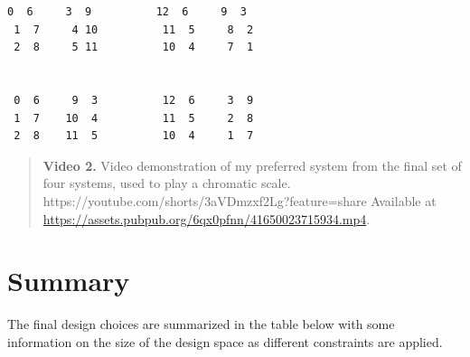 \documentclass[sigconf]{nimeart}
\begin{document}
\begin{Verbatim}[breaklines=true,breakanywhere=true,fontsize=\footnotesize]
 0  6     3  9          12  6     9  3
 1  7     4 10          11  5     8  2
 2  8     5 11          10  4     7  1


 0  6     9  3          12  6     3  9
 1  7    10  4          11  5     2  8
 2  8    11  5          10  4     1  7
\end{Verbatim}


\begin{quote}\small\textbf{Video 2.} Video demonstration of my preferred system from the final set of four systems, used to play a chromatic scale. https://youtube.com/shorts/3aVDmzxf2Lg?feature=share Available at \url{https://assets.pubpub.org/6qx0pfnn/41650023715934.mp4}.\end{quote}


\section{Summary}\label{summary}

The final design choices are summarized in the table below with some information on the size of the design space as different constraints are applied.
\end{document}
